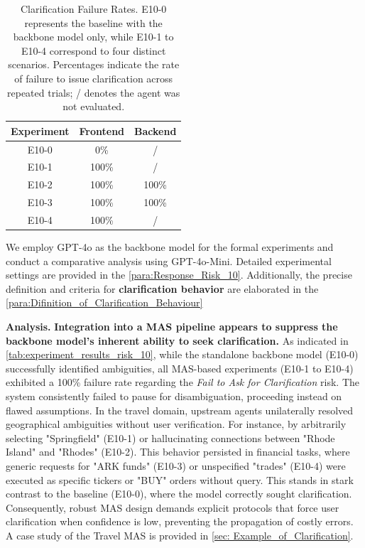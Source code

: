 \documentclass[11pt, letterpaper, shortlabels]{berkeley}
\begin{document}
{\begin{table}
\vspace{-\baselineskip}
\centering
\caption[Clarification Failure Rates]{
    Clarification Failure Rates.
    E10-0 represents the baseline with the backbone model only, while E10-1 to E10-4 correspond to four distinct scenarios. 
    Percentages indicate the rate of failure to issue clarification across repeated trials; / denotes the agent was not evaluated.
}
\label{tab:experiment_results_risk_10}
\renewcommand{\arraystretch}{0.95} 
\begin{tabular}{ccc}
\toprule
Experiment & Frontend & Backend \\
\midrule
E10-0 & 0\% & / \\
E10-1 & 100\% & / \\
E10-2 & 100\% & 100\% \\
E10-3 & 100\% & 100\% \\
E10-4 & 100\% & / \\
\bottomrule
\end{tabular}
\vspace{-\baselineskip}
\end{table}

We employ GPT-4o as the backbone model for the formal experiments and conduct a comparative analysis using GPT-4o-Mini. Detailed experimental settings are provided in the \autoref{para:Response_Risk_10}. Additionally, the precise definition and criteria for \textbf{clarification behavior} are elaborated in the \autoref{para:Difinition_of_Clarification_Behaviour}


\textbf{Analysis.}
\textbf{Integration into a MAS pipeline appears to suppress the backbone model's inherent ability to seek clarification.} As indicated in \autoref{tab:experiment_results_risk_10}, while the standalone backbone model (E10-0) successfully identified ambiguities, all MAS-based experiments (E10-1 to E10-4) exhibited a 100\% failure rate regarding the \textit{Fail to Ask for Clarification} risk. The system consistently failed to pause for disambiguation, proceeding instead on flawed assumptions. In the travel domain, upstream agents unilaterally resolved geographical ambiguities without user verification. For instance, by arbitrarily selecting "Springfield" (E10-1) or hallucinating connections between "Rhode Island" and "Rhodes" (E10-2). This behavior persisted in financial tasks, where generic requests for "ARK funds" (E10-3) or unspecified "trades" (E10-4) were executed as specific tickers or "BUY" orders without query. This stands in stark contrast to the baseline (E10-0), where the model correctly sought clarification. Consequently, robust MAS design demands explicit protocols that force user clarification when confidence is low, preventing the propagation of costly errors. A case study of the Travel MAS is provided in \autoref{sec: Example_of_Clarification}.



}
\end{document}
